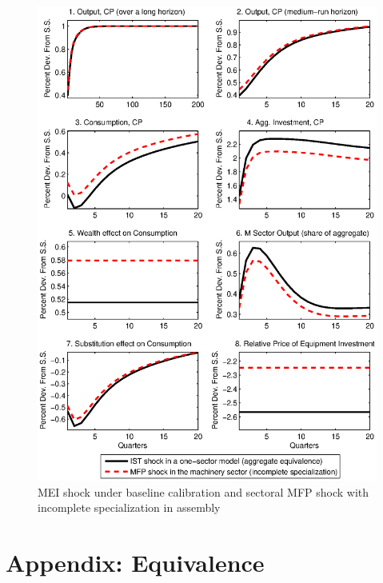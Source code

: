 \documentclass[12pt,fleqn]{article}
\begin{document}
\begin{figure}[tbp] \center
\caption{MEI shock under baseline calibration and sectoral MFP shock
with incomplete specialization in assembly} \label{figure_h1}
\includegraphics[scale=0.8]{figure_h1.ps}

\footnotesize \flushleft
{}
\end{figure}


\clearpage  \normalsize

\appendix

\section{Appendix: Equivalence} \label{appendix_proof}
\end{document}
